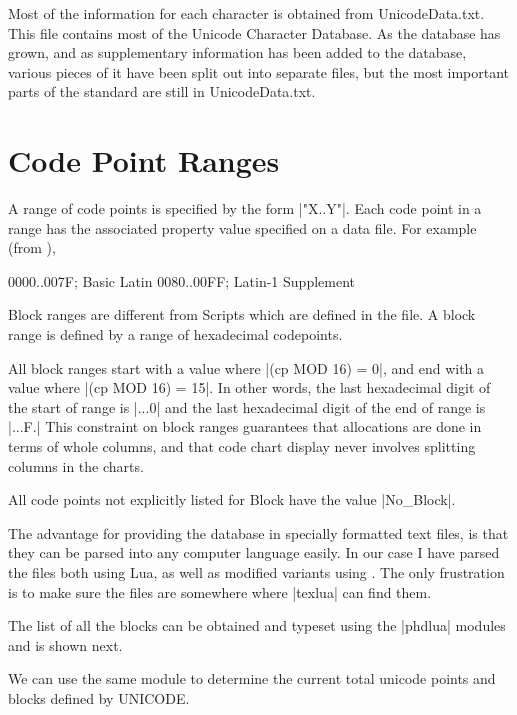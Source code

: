 Most of the information for each character is obtained from UnicodeData.txt. This file contains most of the  
Unicode Character Database. As the database has grown, and as supplementary information has been
added to the database, various pieces of it have been split out into separate files, but the most
important parts of the standard are still in UnicodeData.txt. 

\section{Code Point Ranges}

A range of code points is specified by the form |"X..Y"|.
Each code point in a range has the associated property value specified on a data file. For example (from ),


\begin{dispListing}
0000..007F; Basic Latin
0080..00FF; Latin-1 Supplement
\end{dispListing}

Block ranges are different from Scripts which are defined in the  file. A block range is defined by a range of hexadecimal codepoints. 

All block ranges start with a value where |(cp MOD 16) = 0|,
  and end with a value where |(cp MOD 16) = 15|. In other words,
  the last hexadecimal digit of the start of range is |...0|
  and the last hexadecimal digit of the end of range is |...F.|
  This constraint on block ranges guarantees that allocations
  are done in terms of whole columns, and that code chart display
  never involves splitting columns in the charts.

  All code points not explicitly listed for Block
  have the value |No_Block|.

The advantage for providing the database in specially formatted text files, is that they can be parsed into any computer language easily. In our case I have parsed the files both using Lua, as well as modified variants using \latexe. 
The only frustration is to make sure the files are somewhere where |texlua| can find them. 

The list of all the blocks can be obtained and typeset using the |phdlua| modules and is shown next.

{\parindent0pt
\leavevmode{}
}

We can use the same module to determine the current total unicode points and blocks defined by UNICODE.




